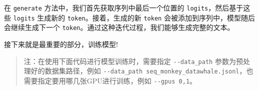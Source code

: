 \documentclass[12pt,a4paper]{book}
\begin{document}
\begin{Shaded}
\begin{Highlighting}[]
            \OperatorTok{==}

\OperatorTok{=}\OperatorTok{=}\NormalTok{)}

\end{Highlighting}
\end{Shaded}

在 \texttt{generate} 方法中，我们首先获取序列中最后一个位置的
\texttt{logits}，然后基于这些 \texttt{logits} 生成新的
\texttt{token}。接着，生成的新 \texttt{token}
会被添加到序列中，模型随后会继续生成下一个
\texttt{token}。通过这种迭代过程，我们能够生成完整的文本。

接下来就是最重要的部分，训练模型!

\begin{quote}
注：在使用下面代码进行模型训练时，需要指定 \texttt{-\/-data\_path}
参数为预处理好的数据集路径，例如
\texttt{-\/-data\_path\ seq\_monkey\_datawhale.jsonl}，也需要指定要用哪几张GPU进行训练，例如
\texttt{-\/-gpus\ 0,1}。
\end{quote}
\end{document}
